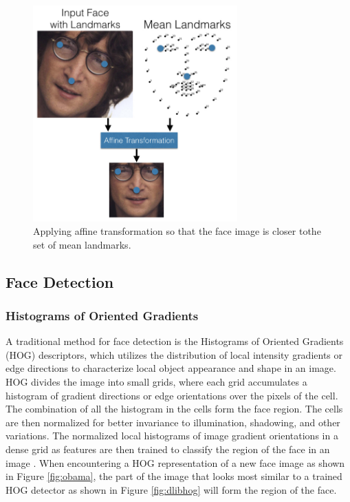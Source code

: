 \documentclass[12pt,english]{article}
\begin{document}
\begin{figure}[!tbp]
 \centering
    \includegraphics[width=0.7\textwidth]{figures/openface_detection.png}
    \caption{Applying affine transformation so that the face image is closer tothe set of mean landmarks. \cite{amos}}
	\label{fig:meanlandmark}
\end{figure}

\subsection{Face Detection}

\subsubsection{Histograms of Oriented Gradients}

\quad

A traditional method for face detection is the Histograms of Oriented Gradients (HOG) descriptors, which utilizes the distribution of local intensity gradients or edge directions to characterize local object appearance and shape in an image. HOG divides the image into small grids, where each grid accumulates a histogram of gradient directions or edge orientations over the pixels of the cell. The combination of all the histogram in the cells form the face region. The cells are then normalized for better invariance to illumination, shadowing, and other variations. The normalized local histograms of image gradient orientations in a dense grid as features are then trained to classify the region of the face in an image \cite{dalal}. When encountering a HOG representation of a new face image as shown in Figure \ref{fig:obama}, the part of the image that looks most similar to a trained HOG detector as shown in Figure \ref{fig:dlibhog} will form the region of the face. 
\end{document}
